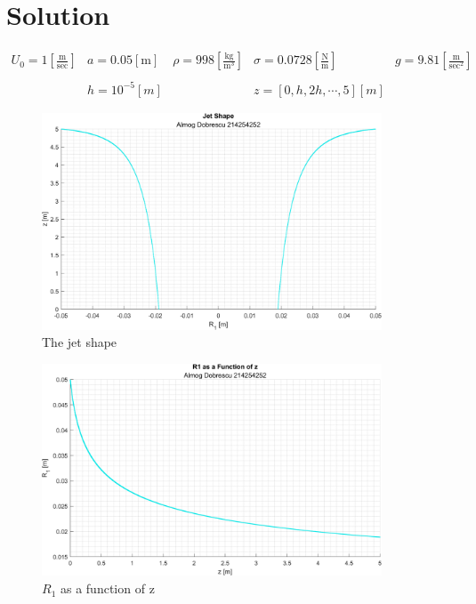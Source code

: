 \documentclass[11pt, a4paper]{article}
\begin{document}
\newpage

\section{Solution}
\begin{equation}
    \begin{matrix}
        \displaystyle U_0=1\left[\frac{\mathrm{m}}{\mathrm{sec}}\right] & a=0.05\left[\mathrm{m}\right] & \displaystyle\rho=998\left[\frac{\mathrm{kg}}{\mathrm{m}^3}\right] & \displaystyle\sigma=0.0728\left[\frac{\mathrm{N}}{\mathrm{m}}\right] & \displaystyle g=9.81\left[\frac{\mathrm{m}}{\mathrm{sec}^2}\right] \\\\
        & h=10^{-5}\left[m\right] && z=\left[0,h,2h,\cdots,5\right]\left[m\right]
    \end{matrix}
\end{equation}
\begin{figure}[H]
    \centering
    \includegraphics[width=0.9\textwidth]{images/graph1.png}
    \caption{The jet shape}
    \label{fig:The_jet_shape}
\end{figure}
\begin{figure}[H]
    \centering
    \includegraphics[width=0.9\textwidth]{images/graph2.png}
    \caption{$R_1$ as a function of z}
    \label{fig:R_1_of_z}
\end{figure}
\end{document}
